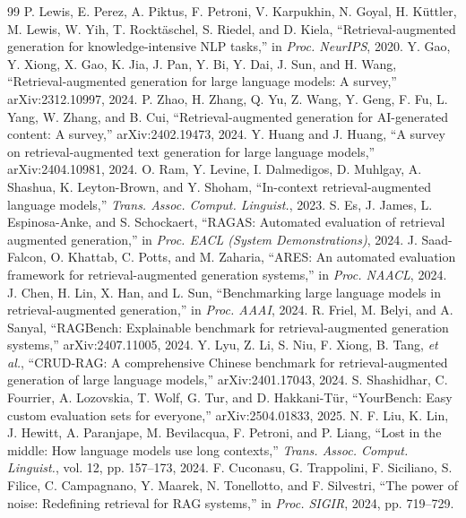 \documentclass[conference]{IEEEtran}
\begin{document}
\begin{thebibliography}{99}
 P. Lewis, E. Perez, A. Piktus, F. Petroni, V. Karpukhin, N. Goyal, H. K\"uttler, M. Lewis, W. Yih, T. Rockt\"aschel, S. Riedel, and D. Kiela, ``Retrieval-augmented generation for knowledge-intensive NLP tasks,'' in \emph{Proc. NeurIPS}, 2020.
 Y. Gao, Y. Xiong, X. Gao, K. Jia, J. Pan, Y. Bi, Y. Dai, J. Sun, and H. Wang, ``Retrieval-augmented generation for large language models: A survey,'' arXiv:2312.10997, 2024.
 P. Zhao, H. Zhang, Q. Yu, Z. Wang, Y. Geng, F. Fu, L. Yang, W. Zhang, and B. Cui, ``Retrieval-augmented generation for AI-generated content: A survey,'' arXiv:2402.19473, 2024.
 Y. Huang and J. Huang, ``A survey on retrieval-augmented text generation for large language models,'' arXiv:2404.10981, 2024.
 O. Ram, Y. Levine, I. Dalmedigos, D. Muhlgay, A. Shashua, K. Leyton-Brown, and Y. Shoham, ``In-context retrieval-augmented language models,'' \emph{Trans. Assoc. Comput. Linguist.}, 2023.
 S. Es, J. James, L. Espinosa-Anke, and S. Schockaert, ``RAGAS: Automated evaluation of retrieval augmented generation,'' in \emph{Proc. EACL (System Demonstrations)}, 2024.
 J. Saad-Falcon, O. Khattab, C. Potts, and M. Zaharia, ``ARES: An automated evaluation framework for retrieval-augmented generation systems,'' in \emph{Proc. NAACL}, 2024.
 J. Chen, H. Lin, X. Han, and L. Sun, ``Benchmarking large language models in retrieval-augmented generation,'' in \emph{Proc. AAAI}, 2024.
 R. Friel, M. Belyi, and A. Sanyal, ``RAGBench: Explainable benchmark for retrieval-augmented generation systems,'' arXiv:2407.11005, 2024.
 Y. Lyu, Z. Li, S. Niu, F. Xiong, B. Tang, \emph{et al.}, ``CRUD-RAG: A comprehensive Chinese benchmark for retrieval-augmented generation of large language models,'' arXiv:2401.17043, 2024.
 S. Shashidhar, C. Fourrier, A. Lozovskia, T. Wolf, G. Tur, and D. Hakkani-T\"ur, ``YourBench: Easy custom evaluation sets for everyone,'' arXiv:2504.01833, 2025.
 N. F. Liu, K. Lin, J. Hewitt, A. Paranjape, M. Bevilacqua, F. Petroni, and P. Liang, ``Lost in the middle: How language models use long contexts,'' \emph{Trans. Assoc. Comput. Linguist.}, vol. 12, pp. 157--173, 2024.
 F. Cuconasu, G. Trappolini, F. Siciliano, S. Filice, C. Campagnano, Y. Maarek, N. Tonellotto, and F. Silvestri, ``The power of noise: Redefining retrieval for RAG systems,'' in \emph{Proc. SIGIR}, 2024, pp. 719--729.

\end{thebibliography}
\end{document}
